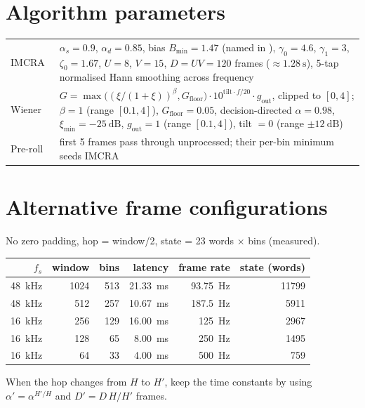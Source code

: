 \section*{Algorithm parameters}

\begin{center}\small
\begin{tabularx}{\textwidth}{@{}lL@{}}
\toprule
IMCRA~\cite{cohen2003imcra} & $\alpha_s=0.9$, $\alpha_d=0.85$, bias $B_{\min}=1.47$ (named  in ), $\gamma_0=4.6$, $\gamma_1=3$, $\zeta_0=1.67$, $U=8$, $V=15$, $D=UV=120$ frames ($\approx\qty{1.28}{\s}$), 5-tap normalised Hann smoothing across frequency \\
Wiener~\cite{ephraim1984mmse,loizou2013se} & $G=\max\big((\xi/(1+\xi))^\beta, G_\text{floor}\big)\cdot 10^{\text{tilt}\cdot f/20}\cdot g_\text{out}$, clipped to $[0,4]$; $\beta=1$ (range $[0.1,4]$), $G_\text{floor}=0.05$, decision-directed $\alpha=0.98$, $\xi_{\min}=\qty{-25}{\dB}$, $g_\text{out}=1$ (range $[0.1,4]$), tilt $=0$ (range $\pm\qty{12}{\dB}$) \\
Pre-roll & first 5 frames pass through unprocessed; their per-bin minimum seeds IMCRA \\
\bottomrule
\end{tabularx}
\end{center}

\section*{Alternative frame configurations}

No zero padding, hop = window/2, state = 23 words $\times$ bins (measured).

\begin{center}\small
\begin{tabular}{@{}rrrrrr@{}}
\toprule
$f_s$ & window & bins & latency & frame rate & state (words) \\
\midrule
\qty{48}{\kHz} & 1024 & 513 & \qty{21.33}{\ms} & \qty{93.75}{\Hz} & \num{11799} \\
\qty{48}{\kHz} & 512  & 257 & \qty{10.67}{\ms} & \qty{187.5}{\Hz} & \num{5911} \\
\qty{16}{\kHz} & 256  & 129 & \qty{16.00}{\ms} & \qty{125}{\Hz} & \num{2967} \\
\qty{16}{\kHz} & 128  & 65  & \qty{8.00}{\ms}  & \qty{250}{\Hz} & \num{1495} \\
\qty{16}{\kHz} & 64   & 33  & \qty{4.00}{\ms}  & \qty{500}{\Hz} & \num{759} \\
\bottomrule
\end{tabular}
\end{center}
When the hop changes from $H$ to $H'$, keep the time constants by using
$\alpha'=\alpha^{H'/H}$ and $D'=D\,H/H'$ frames.

